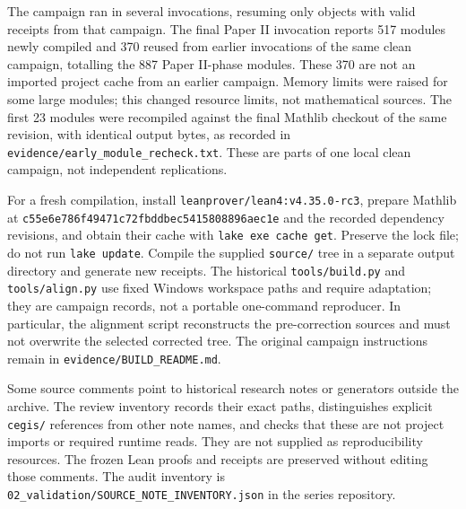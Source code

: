 \documentclass[english,11pt,a4paper]{article}
\begin{document}
The campaign ran in several invocations, resuming only objects with valid receipts from that campaign. The final Paper II invocation reports 517 modules newly compiled and 370 reused from earlier invocations of the same clean campaign, totalling the 887 Paper II-phase modules. These 370 are not an imported project cache from an earlier campaign. Memory limits were raised for some large modules; this changed resource limits, not mathematical sources. The first 23 modules were recompiled against the final Mathlib checkout of the same revision, with identical output bytes, as recorded in \texttt{evidence/\allowbreak{}ear\allowbreak{}ly\_\allowbreak{}module\_\allowbreak{}re\allowbreak{}check.\allowbreak{}txt}. These are parts of one local clean campaign, not independent replications.

For a fresh compilation, install \texttt{leanprover/\allowbreak{}l\allowbreak{}ean4:v4.\allowbreak{}35.\allowbreak{}0\allowbreak{}-\allowbreak{}rc3}, prepare Mathlib at \texttt{c55e6e78\allowbreak{}6f49\allowbreak{}471c\allowbreak{}72fbddbe\allowbreak{}\allowbreak{}c5415808\allowbreak{}896a\allowbreak{}ec1e\allowbreak{}} and the recorded dependency revisions, and obtain their cache with \texttt{lake exe cac\allowbreak{}he get}. Preserve the lock file; do not run \texttt{lake update}. Compile the supplied \texttt{source/\allowbreak{}} tree in a separate output directory and generate new receipts. The historical \texttt{tools/\allowbreak{}build.\allowbreak{}\allowbreak{}py} and \texttt{tools/\allowbreak{}align.\allowbreak{}\allowbreak{}py} use fixed Windows workspace paths and require adaptation; they are campaign records, not a portable one-command reproducer. In particular, the alignment script reconstructs the pre-correction sources and must not overwrite the selected corrected tree. The original campaign instructions remain in \texttt{evidence/\allowbreak{}BUI\allowbreak{}LD\_\allowbreak{}README.\allowbreak{}md\allowbreak{}}.

Some source comments point to historical research notes or generators outside the archive. The review inventory records their exact paths, distinguishes explicit \texttt{cegis/\allowbreak{}} references from other note names, and checks that these are not project imports or required runtime reads. They are not supplied as reproducibility resources. The frozen Lean proofs and receipts are preserved without editing those comments. The audit inventory is \texttt{02\_\allowbreak{}validatio\allowbreak{}n/\allowbreak{}SOURCE\_\allowbreak{}NOT\allowbreak{}E\_\allowbreak{}INVENTORY.\allowbreak{}\allowbreak{}json} in the series repository.
\end{document}
